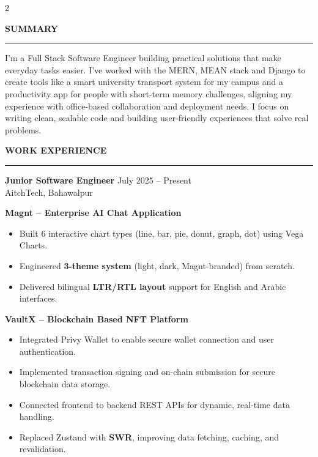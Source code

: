 \documentclass[12pt,a4paper]{article}
\newcommand{\leftsection}[1]{%
  \vspace{6pt}%
  {\color{accentcyan}\Large\bfseries #1}\\[-2pt]%
  {\color{sectionline}\rule{\linewidth}{1pt}}%
  \vspace{3pt}%
}
\newcommand{\jobheading}[4]{%
  \vspace{4pt}%
  {\bfseries\color{darktext} #1} \hfill {\small\color{medgrey} #3}\\%
  {\small\color{accentcyan} #2} \hfill {\small\color{medgrey} #4}%
  \vspace{2pt}%
}
\newenvironment{cvitems}{%
  \begin{itemize}[leftmargin=1em, itemsep=0pt, parsep=0pt, topsep=2pt, label={\color{accentcyan}\tiny$\bullet$}]%
  \small\color{bodytext}%
}{%
  \end{itemize}%
}
\begin{document}
\setlength{\columnsep}{14pt}
\begin{paracol}{2}


\leftsection{SUMMARY}
{\small\color{bodytext}
I'm a Full Stack Software Engineer building practical solutions that make everyday tasks easier.
I've worked with the MERN, MEAN stack and Django to create tools like a smart university
transport system for my campus and a productivity app for people with short-term memory
challenges, aligning my experience with office-based collaboration and deployment needs.
I focus on writing clean, scalable code and building user-friendly experiences that solve real problems.
}

\vspace{2pt}
\leftsection{WORK EXPERIENCE}

\jobheading{Junior Software Engineer}{AitchTech, Bahawalpur}{July 2025 -- Present}{}

\vspace{3pt}
{\small\bfseries\color{darktext} Magnt -- Enterprise AI Chat Application}
\begin{cvitems}
  \item Built 6 interactive chart types (line, bar, pie, donut, graph, dot) using Vega Charts.
  \item Engineered \textbf{3-theme system} (light, dark, Magnt-branded) from scratch.
  \item Delivered bilingual \textbf{LTR/RTL layout} support for English and Arabic interfaces.
\end{cvitems}

\vspace{2pt}
{\small\bfseries\color{darktext} VaultX -- Blockchain Based NFT Platform}
\begin{cvitems}
  \item Integrated Privy Wallet to enable secure wallet connection and user authentication.
  \item Implemented transaction signing and on-chain submission for secure blockchain data storage.
  \item Connected frontend to backend REST APIs for dynamic, real-time data handling.
  \item Replaced Zustand with \textbf{SWR}, improving data fetching, caching, and revalidation.
\end{cvitems}


\end{paracol}
\end{document}
